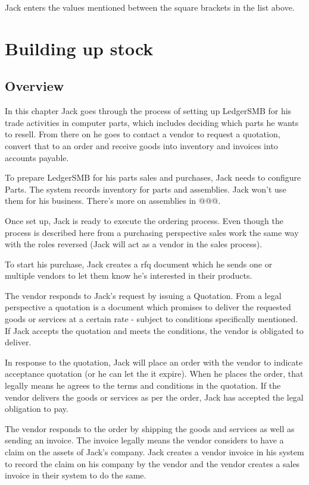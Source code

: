 Jack enters the values mentioned between the square brackets in the list above.



\chapter{Building up stock}
\label{cha:building-up-stock}

\section{Overview}

In this chapter Jack goes through the process of setting up LedgerSMB for his
trade activities in computer parts, which includes deciding which parts he wants to
resell. From there on he goes to contact a vendor to request a quotation, convert that
to an order and receive goods into inventory and invoices into accounts payable.

To prepare LedgerSMB for his parts sales and purchases, Jack needs to configure Parts.
The system records inventory for parts and assemblies. Jack won't use them for his
business. There's more on assemblies in @@@.

Once set up, Jack is ready to execute the ordering process. Even though the process
is described here from a purchasing perspective sales work the same way with the roles
reversed (Jack will act as a vendor in the sales process).

To start his purchase, Jack creates a \gls{rfq} document which
he sends one or multiple vendors to let them know he's interested in their products.

The vendor responds to Jack's request by issuing a Quotation. From a legal perspective
a quotation is a document which promises to deliver the requested goods or services at a
certain rate - subject to conditions specifically mentioned. If Jack accepts the quotation
and meets the conditions, the vendor is obligated to deliver.

In response to the quotation, Jack will place an order with the vendor to indicate
acceptance quotation (or he can let the
it expire). When he places the order, that legally means he agrees to the terms
and conditions in the quotation. If the vendor delivers the goods or services as per the
order, Jack has accepted the legal obligation to pay.

The vendor responds to the order by shipping the goods and services as well
as sending an invoice. The invoice legally means the vendor considers to have a claim on the assets
of Jack's company. Jack creates a vendor invoice in his system to record the claim on his
company by the vendor and the vendor creates a sales invoice in their system to do the same.

